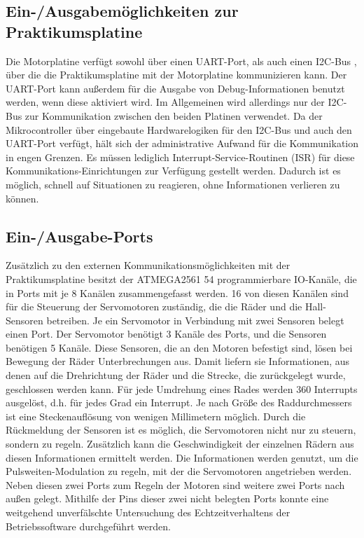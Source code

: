\subsection{Ein-/Ausgabemöglichkeiten zur Praktikumsplatine}
Die Motorplatine verfügt sowohl über einen UART-Port, als auch einen I2C-Bus \cite{I2C_WIKI}, über die
die Praktikumsplatine mit der Motorplatine kommunizieren kann. Der UART-Port kann außerdem
für die Ausgabe von Debug-Informationen benutzt werden, wenn diese aktiviert wird. Im Allgemeinen
wird allerdings nur der I2C-Bus zur Kommunikation zwischen den beiden Platinen verwendet.
Da der Mikrocontroller über eingebaute Hardwarelogiken für den I2C-Bus und auch
den UART-Port verfügt, hält sich der administrative Aufwand für die Kommunikation in engen
Grenzen. Es müssen lediglich Interrupt-Service-Routinen (ISR) für diese Kommunikations-Einrichtungen zur Verfügung gestellt
werden. Dadurch ist es möglich, schnell auf Situationen zu reagieren, ohne Informationen verlieren zu können.
\subsection{Ein-/Ausgabe-Ports}
Zusätzlich zu den externen Kommunikationsmöglichkeiten mit der Praktikumsplatine besitzt der ATMEGA2561 54
programmierbare IO-Kanäle, die in Ports mit je 8 Kanälen zusammengefasst werden. 16 von diesen
Kanälen sind für die Steuerung der Servomotoren zuständig, die die Räder und die Hall-Sensoren betreiben.
Je ein Servomotor in Verbindung mit zwei Sensoren belegt einen Port. Der Servomotor benötigt 3 Kanäle
des Ports, und die Sensoren benötigen 5 Kanäle.
Diese Sensoren, die an den Motoren befestigt sind, lösen bei Bewegung der Räder Unterbrechungen aus.
Damit liefern sie Informationen, aus denen auf die Drehrichtung der Räder und die Strecke, die zurückgelegt wurde,
geschlossen werden kann.
Für jede Umdrehung eines Rades werden 360 Interrupts ausgelöst, d.h. für jedes Grad ein Interrupt. Je
nach Größe des Raddurchmessers ist eine Steckenauflösung von wenigen Millimetern möglich.
Durch die Rückmeldung der Sensoren ist es möglich, die Servomotoren nicht nur zu steuern, sondern zu regeln.
Zusätzlich kann die Geschwindigkeit der einzelnen Rädern aus diesen Informationen ermittelt werden.
Die Informationen werden genutzt, um die Pulsweiten-Modulation zu regeln, mit der die Servomotoren angetrieben
werden.\\
Neben diesen zwei Ports zum Regeln der Motoren sind weitere zwei Ports nach außen gelegt. Mithilfe
der Pins dieser zwei nicht belegten Ports konnte eine weitgehend unverfälschte Untersuchung des
Echtzeitverhaltens der Betriebssoftware durchgeführt werden.

